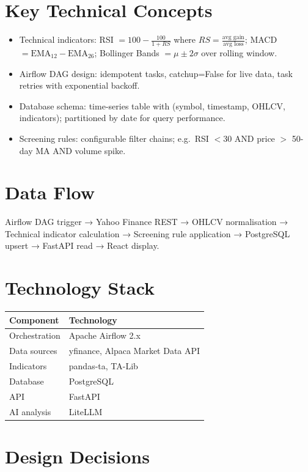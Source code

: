 \documentclass[11pt,a4paper]{article}
\begin{document}
\section{Key Technical Concepts}
\begin{itemize}[leftmargin=1.5em]
  \item Technical indicators: RSI $= 100 - \frac{100}{1 + RS}$ where $RS = \frac{\text{avg gain}}{\text{avg loss}}$; MACD $= \text{EMA}_{12} - \text{EMA}_{26}$; Bollinger Bands $= \mu \pm 2\sigma$ over rolling window.
  \item Airflow DAG design: idempotent tasks, catchup=False for live data, task retries with exponential backoff.
  \item Database schema: time-series table with (symbol, timestamp, OHLCV, indicators); partitioned by date for query performance.
  \item Screening rules: configurable filter chains; e.g.\ RSI $< 30$ AND price $>$ 50-day MA AND volume spike.
\end{itemize}

\section{Data Flow}

Airflow DAG trigger → Yahoo Finance REST → OHLCV normalisation →
Technical indicator calculation → Screening rule application →
PostgreSQL upsert → FastAPI read → React display.


\section{Technology Stack}

\begin{tabular}{ll}
\toprule
\textbf{Component} & \textbf{Technology} \\
\midrule
Orchestration & Apache Airflow 2.x \\
Data sources & yfinance, Alpaca Market Data API \\
Indicators & pandas-ta, TA-Lib \\
Database & PostgreSQL \\
API & FastAPI \\
AI analysis & LiteLLM \\
\bottomrule
\end{tabular}


\section{Design Decisions}
\end{document}
